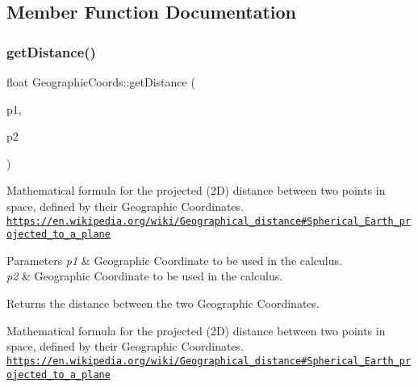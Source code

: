 \subsection{Member Function Documentation}
\hypertarget{class_geographic_coords_a25f3ba7791c305b8620bb0ef8adac156}{}\label{class_geographic_coords_a25f3ba7791c305b8620bb0ef8adac156} 
\subsubsection{\texorpdfstring{get\+Distance()}{getDistance()}}
{\footnotesize\ttfamily float Geographic\+Coords\+::get\+Distance (\begin{DoxyParamCaption}\item[{const \hyperlink{class_geographic_coords}{Geographic\+Coords} \&}]{p1,  }\item[{const \hyperlink{class_geographic_coords}{Geographic\+Coords} \&}]{p2 }\end{DoxyParamCaption})\hspace{0.3cm}{\ttfamily [static]}}

Mathematical formula for the projected (2D) distance between two points in space, defined by their Geographic Coordinates. \href{https://en.wikipedia.org/wiki/Geographical_distance#Spherical_Earth_projected_to_a_plane}{\tt https\+://en.\+wikipedia.\+org/wiki/\+Geographical\+\_\+distance\#\+Spherical\+\_\+\+Earth\+\_\+projected\+\_\+to\+\_\+a\+\_\+plane}


\begin{DoxyParams}{Parameters}
{\em p1} & Geographic Coordinate to be used in the calculus. \\
\hline
{\em p2} & Geographic Coordinate to be used in the calculus.\\
\hline
\end{DoxyParams}
\begin{DoxyReturn}{Returns}
the distance between the two Geographic Coordinates.
\end{DoxyReturn}
Mathematical formula for the projected (2D) distance between two points in space, defined by their Geographic Coordinates. \href{https://en.wikipedia.org/wiki/Geographical_distance#Spherical_Earth_projected_to_a_plane}{\tt https\+://en.\+wikipedia.\+org/wiki/\+Geographical\+\_\+distance\#\+Spherical\+\_\+\+Earth\+\_\+projected\+\_\+to\+\_\+a\+\_\+plane} \hypertarget{class_geographic_coords_ab2fa1d7cde50be2a00c297caa302297a}{}\label{class_geographic_coords_ab2fa1d7cde50be2a00c297caa302297a} 
